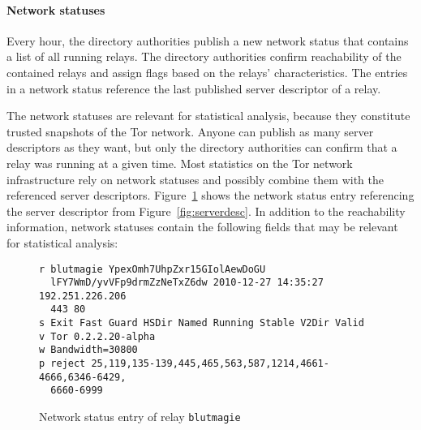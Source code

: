 \documentclass{article}
\begin{document}
\paragraph{Network statuses}

Every hour, the directory authorities publish a new network status that
contains a list of all running relays.
The directory authorities confirm reachability of the contained relays and
assign flags based on the relays' characteristics.
The entries in a network status reference the last published server
descriptor of a relay.

The network statuses are relevant for statistical analysis, because they
constitute trusted snapshots of the Tor network.
Anyone can publish as many server descriptors as they want, but only the
directory authorities can confirm that a relay was running at a given
time.
Most statistics on the Tor network infrastructure rely on network statuses
and possibly combine them with the referenced server descriptors.
Figure~\ref{fig:statusentry} shows the network status entry referencing
the server descriptor from Figure~\ref{fig:serverdesc}.
In addition to the reachability information, network statuses contain the
following fields that may be relevant for statistical analysis:

\begin{figure}
\begin{verbatim}
r blutmagie YpexOmh7UhpZxr15GIolAewDoGU
  lFY7WmD/yvVFp9drmZzNeTxZ6dw 2010-12-27 14:35:27 192.251.226.206
  443 80
s Exit Fast Guard HSDir Named Running Stable V2Dir Valid
v Tor 0.2.2.20-alpha
w Bandwidth=30800
p reject 25,119,135-139,445,465,563,587,1214,4661-4666,6346-6429,
  6660-6999
\end{verbatim}
\vspace{-1em}
\caption{Network status entry of relay \texttt{blutmagie}}
\label{fig:statusentry}
\end{figure}
\end{document}
